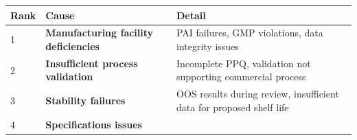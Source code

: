 \documentclass[
  11pt,
  a4paper,
]{report}
\begin{document}
\begin{longtable}[]{@{}lll@{}}
\toprule
\begin{minipage}[b]{0.26\columnwidth}\raggedright
Rank\strut
\end{minipage} & \begin{minipage}[b]{0.30\columnwidth}\raggedright
Cause\strut
\end{minipage} & \begin{minipage}[b]{0.35\columnwidth}\raggedright
Detail\strut
\end{minipage}\tabularnewline
\midrule
\endhead
\begin{minipage}[t]{0.26\columnwidth}\raggedright
1\strut
\end{minipage} & \begin{minipage}[t]{0.30\columnwidth}\raggedright
\textbf{Manufacturing facility deficiencies}\strut
\end{minipage} & \begin{minipage}[t]{0.35\columnwidth}\raggedright
PAI failures, GMP violations, data integrity issues\strut
\end{minipage}\tabularnewline
\begin{minipage}[t]{0.26\columnwidth}\raggedright
2\strut
\end{minipage} & \begin{minipage}[t]{0.30\columnwidth}\raggedright
\textbf{Insufficient process validation}\strut
\end{minipage} & \begin{minipage}[t]{0.35\columnwidth}\raggedright
Incomplete PPQ, validation not supporting commercial process\strut
\end{minipage}\tabularnewline
\begin{minipage}[t]{0.26\columnwidth}\raggedright
3\strut
\end{minipage} & \begin{minipage}[t]{0.30\columnwidth}\raggedright
\textbf{Stability failures}\strut
\end{minipage} & \begin{minipage}[t]{0.35\columnwidth}\raggedright
OOS results during review, insufficient data for proposed shelf
life\strut
\end{minipage}\tabularnewline
\begin{minipage}[t]{0.26\columnwidth}\raggedright
4\strut
\end{minipage} & \begin{minipage}[t]{0.30\columnwidth}\raggedright
\textbf{Specifications issues}\strut
\end{minipage} & \begin{minipage}[t]{0.35\columnwidth}\raggedright

\end{minipage}
\end{longtable}
\end{document}
